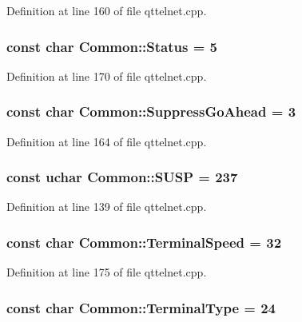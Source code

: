 Definition at line 160 of file qttelnet.cpp.

\hypertarget{namespaceCommon_a38d2c077d41cef5287644f6605b4af1c}{
\subsubsection[{Status}]{\setlength{\rightskip}{0pt plus 5cm}const char {\bf Common::Status} = 5}}
\label{namespaceCommon_a38d2c077d41cef5287644f6605b4af1c}


Definition at line 170 of file qttelnet.cpp.

\hypertarget{namespaceCommon_a9c53b6b00cd382ab0ffdead6f19024d6}{
\subsubsection[{SuppressGoAhead}]{\setlength{\rightskip}{0pt plus 5cm}const char {\bf Common::SuppressGoAhead} = 3}}
\label{namespaceCommon_a9c53b6b00cd382ab0ffdead6f19024d6}


Definition at line 164 of file qttelnet.cpp.

\hypertarget{namespaceCommon_a298ad65506db60a8fc1f7ffe0e2287e8}{
\subsubsection[{SUSP}]{\setlength{\rightskip}{0pt plus 5cm}const uchar {\bf Common::SUSP} = 237}}
\label{namespaceCommon_a298ad65506db60a8fc1f7ffe0e2287e8}


Definition at line 139 of file qttelnet.cpp.

\hypertarget{namespaceCommon_a9651129748e1bb0947ce21f5b0abf02c}{
\subsubsection[{TerminalSpeed}]{\setlength{\rightskip}{0pt plus 5cm}const char {\bf Common::TerminalSpeed} = 32}}
\label{namespaceCommon_a9651129748e1bb0947ce21f5b0abf02c}


Definition at line 175 of file qttelnet.cpp.

\hypertarget{namespaceCommon_a9f04b2b701b3c0aa669a6c9fc6541e26}{
\subsubsection[{TerminalType}]{\setlength{\rightskip}{0pt plus 5cm}const char {\bf Common::TerminalType} = 24}}
\label{namespaceCommon_a9f04b2b701b3c0aa669a6c9fc6541e26}


